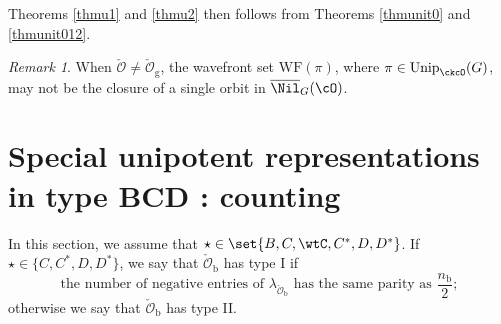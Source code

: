 \documentclass[12pt,a4paper]{amsart}
\newcommand{\WF}{\mathrm{WF}}
\newcommand{\CO}{{\mathcal {O}}}
\newcommand{\be}{\begin {equation}}
\newcommand{\ee}{\end {equation}}
\numberwithin{equation}{section}
\theoremstyle{remark}
\newtheorem{remark}[thm]{Remark}
\def\Unip{\mathrm{Unip}}
\begin{document}
Theorems \ref{thmu1} and \ref{thmu2} then follows from Theorems \ref{thmunit0} and \ref{thmunit012}.

\begin{remark}
  When $\check \CO\neq \check \CO_{\mathrm g}$, the wavefront set $\WF(\pi)$, where $\pi\in \Unip_{\ckcO}(G)$,  may not be the closure of a single orbit in
   $\overline \Nil_{G}(\cO)$.
\end{remark}



\section{Special unipotent representations in type BCD : counting}





In this section, we assume that $\star \in \set{B,C,\wtC,C^{*},D,D^{*}}$.
If  $\star\in \{C, C^*, D, D^*\}$, we say that $\check \CO_\mathrm b$ has type I if
  \be\label{assumi}
  \textrm{the number of negative entries of $\lambda_{\check \CO_\mathrm b}$ has the same parity as $\frac{n_\mathrm b}{2}$};
  \ee
  otherwise we say that $\check \CO_\mathrm b$ has type II.
\end{document}
